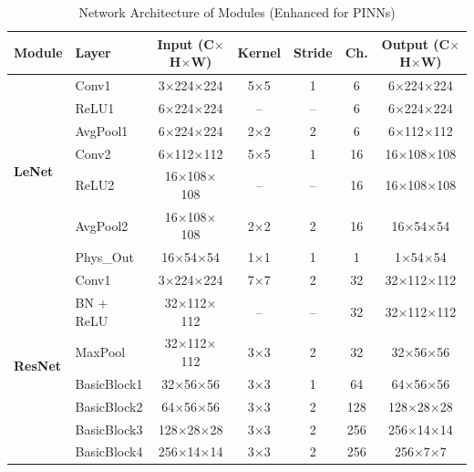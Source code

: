 \documentclass[twocolumn,iicol,pdflatex,sn-mathphys-num]{sn-jnl}%
\begin{document}
\begin{table}[htbp]
	\centering
	\caption{Network Architecture of Modules (Enhanced for PINNs)}
	\label{tab1}
	\footnotesize
	\setlength{\tabcolsep}{2.5pt}
	\begin{tabular}{@{}llccccc@{}}
		\toprule
		\textbf{Module} & \textbf{Layer} & \textbf{Input (C$\times$H$\times$W)} & \textbf{Kernel} & \textbf{Stride} & \textbf{Ch.} & \textbf{Output (C$\times$H$\times$W)} \\
		\midrule
		\multirow{7}{*}{\textbf{LeNet}} 
		&Conv1        & 3$\times$224$\times$224 & 5$\times$5 & 1  & 6   & 6$\times$224$\times$224 \\
		&ReLU1         & 6$\times$224$\times$224  & --          & --     & 6        & 6$\times$224$\times$224 \\
		&AvgPool1      & 6$\times$224$\times$224  & 2$\times$2  & 2      & 6        & 6$\times$112$\times$112 \\
		&Conv2         & 6$\times$112$\times$112  & 5$\times$5  & 1      & 16       & 16$\times$108$\times$108 \\
		&ReLU2         & 16$\times$108$\times$108 & --          & --     & 16       & 16$\times$108$\times$108 \\
		&AvgPool2      & 16$\times$108$\times$108 & 2$\times$2  & 2      & 16       & 16$\times$54$\times$54 \\
		&Phys\_Out     & 16$\times$54$\times$54   & 1$\times$1  & 1      & 1        & 1$\times$54$\times$54 \\
		\midrule
		\multirow{9}{*}{\textbf{ResNet}} 
		&Conv1         & 3$\times$224$\times$224  & 7$\times$7  & 2      & 32            & 32$\times$112$\times$112 \\
		&BN + ReLU     & 32$\times$112$\times$112 & --          & --     & 32            & 32$\times$112$\times$112 \\
		&MaxPool       & 32$\times$112$\times$112 & 3$\times$3  & 2      & 32            & 32$\times$56$\times$56 \\
		&BasicBlock1   & 32$\times$56$\times$56   & 3$\times$3  & 1      & 64 & 64$\times$56$\times$56 \\
		&BasicBlock2   & 64$\times$56$\times$56   & 3$\times$3  & 2      & 128 & 128$\times$28$\times$28 \\
		&BasicBlock3   & 128$\times$28$\times$28  & 3$\times$3  & 2      & 256 & 256$\times$14$\times$14 \\
		&BasicBlock4   & 256$\times$14$\times$14  & 3$\times$3  & 2      & 256            & 256$\times$7$\times$7 \\

\end{tabular}
\end{table}
\end{document}
